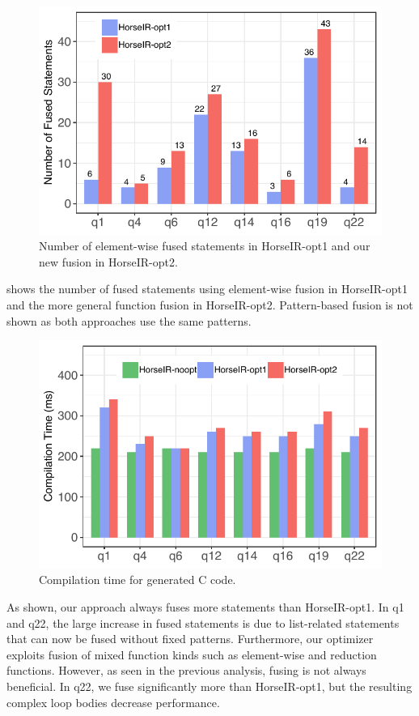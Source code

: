 \begin{figure}[htbp]
\centering
\includegraphics[width=.85\columnwidth]{./src/figure/bar-number.pdf}
\vspace{-3mm}
\caption{Number of element-wise fused statements in HorseIR-opt1 and our new
fusion in HorseIR-opt2.}
\label{fig:opt_number}
\end{figure}

 shows the number of fused statements using
element-wise fusion in HorseIR-opt1 and the more general function fusion in
HorseIR-opt2. Pattern-based fusion is not shown as both approaches use the
same patterns. 

\begin{figure}[htbp]
\centering
\includegraphics[width=.8\columnwidth]{./src/figure/compile-time.pdf}
\vspace{-3mm}
\caption{Compilation time for generated C code.}
\label{fig:compilation_time}
\end{figure}


As shown, our approach always fuses more statements than HorseIR-opt1.
In q1 and q22, the large increase in fused statements is due to list-related
statements that can now be fused without fixed patterns. Furthermore, our optimizer
exploits fusion of mixed function kinds such as element-wise and reduction functions.
However, as seen in the previous analysis, fusing is not always beneficial. In q22,
we fuse significantly more than HorseIR-opt1, but the resulting complex loop
bodies decrease performance.

